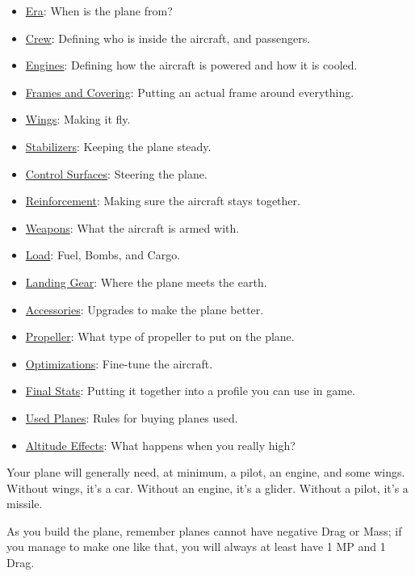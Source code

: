 \documentclass{article}
\begin{document}
\begin{itemize}
  \item  \hyperref[_Era]{Era}: When is the plane from?
  \item  \hyperref[_Crew]{Crew}: Defining who is inside the aircraft, and passengers.
  \item  \hyperref[_Engines]{Engines}: Defining how the aircraft is powered and how it is cooled.
  \item  \hyperref[_Frame_and_Covering]{Frames and Covering}: Putting an actual frame around everything.
  \item  \hyperref[_Wings]{Wings}: Making it fly.
  \item  \hyperref[_Stabilizers]{Stabilizers}: Keeping the plane steady.
  \item  \hyperref[_Control_Surfaces]{Control Surfaces}: Steering the plane.
  \item  \hyperref[_Reinforcement]{Reinforcement}: Making sure the aircraft stays together.
  \item  \hyperref[_Weapons]{Weapons}: What the aircraft is armed with.
  \item  \hyperref[_Load]{Load}: Fuel, Bombs, and Cargo.
  \item  \hyperref[_Landing_Gear]{Landing Gear}: Where the plane meets the earth.
  \item  \hyperref[_Upgrades]{Accessories}: Upgrades to make the plane better.
  \item  \hyperref[_Propeller]{Propeller}: What type of propeller to put on the plane.
  \item  \hyperref[_Optimization]{Optimizations}: Fine-tune the aircraft.
  \item  \hyperref[_Final_Calculations]{Final Stats}: Putting it together into a profile you can use in game.
  \item  \hyperref[_Used_Planes]{Used Planes}: Rules for buying planes used.
  \item  \hyperref[_Altitude_Rules]{Altitude Effects}: What happens when you really high?
\end{itemize}

Your plane will generally need, at minimum, a pilot, an engine, and some
wings. Without wings, it's a car. Without an engine, it's a glider.
Without a pilot, it's a missile.

As you build the plane, remember planes cannot have negative Drag or
Mass; if you manage to make one like that, you will always at least have
1 MP and 1 Drag.
\end{document}
